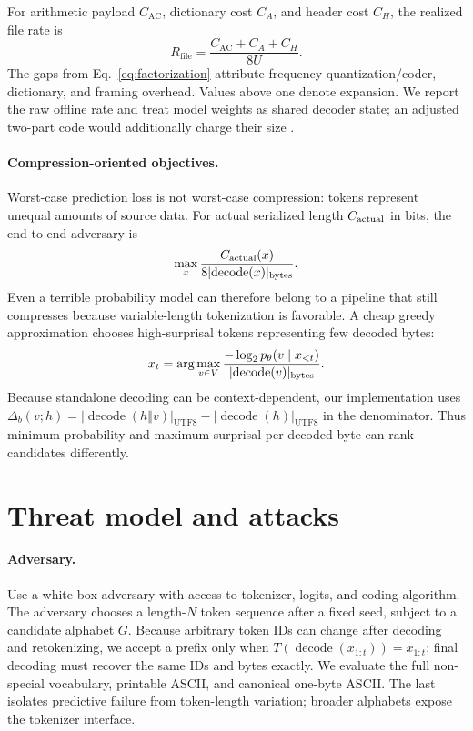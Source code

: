 \documentclass{article}
\newcommand{\bytes}[1]{\lvert #1\rvert_{\mathrm{UTF8}}}
\begin{document}
For arithmetic payload $C_{\mathrm{AC}}$, dictionary cost $C_A$, and header cost
$C_H$, the realized file rate is
\begin{equation}
R_{\mathrm{file}}=\frac{C_{\mathrm{AC}}+C_A+C_H}{8U}.
\end{equation}
The gaps from Eq.~\ref{eq:factorization} attribute frequency quantization/coder,
dictionary, and framing overhead. Values above one denote expansion.
We report the raw offline rate and treat model weights as shared decoder state;
an adjusted two-part code would additionally charge their size
\citep{deletang2024language}.

\paragraph{Compression-oriented objectives.}
Worst-case prediction loss is not worst-case compression: tokens represent
unequal amounts of source data. For actual serialized length $C_{\rm actual}$
in bits, the end-to-end adversary is
\begin{equation}
  \max_x\frac{C_{\rm actual}(x)}
  {8\lvert\operatorname{decode}(x)\rvert_{\rm bytes}}.
  \label{eq:actual-attack}
\end{equation}
Even a terrible probability model can therefore belong to a pipeline that still
compresses because variable-length tokenization is favorable. A cheap greedy
approximation chooses high-surprisal tokens representing few decoded bytes:
\begin{equation}
  x_t=\arg\max_{v\in V}
  \frac{-\log_2p_\theta(v\mid x_{<t})}
  {\lvert\operatorname{decode}(v)\rvert_{\rm bytes}}.
  \label{eq:byte-greedy}
\end{equation}
Because standalone decoding can be context-dependent, our implementation uses
$\Delta_b(v;h)=\bytes{\operatorname{decode}(h\mathbin\Vert v)}-
\bytes{\operatorname{decode}(h)}$ in the denominator. Thus minimum probability
and maximum surprisal per decoded byte can rank candidates differently.

\section{Threat model and attacks}
\label{sec:attacks}

\paragraph{Adversary.}
Use a white-box adversary with access to tokenizer, logits, and coding algorithm.
The adversary chooses a length-$N$ token sequence after a fixed seed, subject to
a candidate alphabet $G$. Because arbitrary token IDs can change after decoding
and retokenizing, we accept a prefix only when
$T(\operatorname{decode}(x_{1:t}))=x_{1:t}$; final decoding must recover the same
IDs and bytes exactly. We evaluate the full non-special vocabulary, printable
ASCII, and canonical one-byte ASCII. The last isolates predictive failure from
token-length variation; broader alphabets expose the tokenizer interface.
\end{document}
